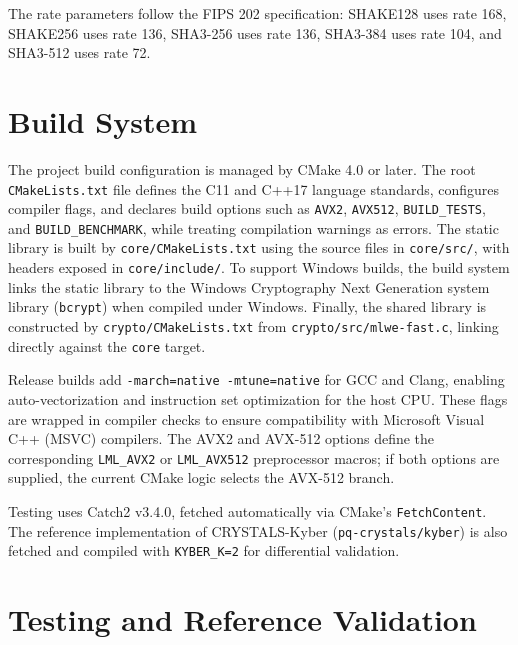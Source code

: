 The rate parameters follow the FIPS 202 specification: SHAKE128 uses rate 168, SHAKE256 uses rate 136, SHA3-256 uses rate 136, SHA3-384 uses rate 104, and SHA3-512 uses rate 72.

\section{Build System}
\label{sec:build_system}

The project build configuration is managed by CMake 4.0 or later. The root \texttt{CMake}\allowbreak\texttt{Lists.txt} file defines the C11 and C++17 language standards, configures compiler flags, and declares build options such as \texttt{AVX2}, \texttt{AVX512}, \texttt{BUILD\_}\allowbreak\texttt{TESTS}, and \texttt{BUILD\_}\allowbreak\texttt{BENCHMARK}, while treating compilation warnings as errors. The static library is built by \texttt{core/}\allowbreak\texttt{CMake}\allowbreak\texttt{Lists.txt} using the source files in \texttt{core/}\allowbreak\texttt{src/}, with headers exposed in \texttt{core/}\allowbreak\texttt{include/}. To support Windows builds, the build system links the static library to the Windows Cryptography Next Generation system library (\texttt{bcrypt}) when compiled under Windows. Finally, the shared library is constructed by \texttt{crypto/}\allowbreak\texttt{CMake}\allowbreak\texttt{Lists.txt} from \texttt{crypto/}\allowbreak\texttt{src/}\allowbreak\texttt{mlwe-}\allowbreak\texttt{fast.c}, linking directly against the \texttt{core} target.

Release builds add \texttt{-march=native -mtune=native} for GCC and Clang, enabling auto-vectorization and instruction set optimization for the host CPU. These flags are wrapped in compiler checks to ensure compatibility with Microsoft Visual C++ (MSVC) compilers. The AVX2 and AVX-512 options define the corresponding \texttt{LML\_AVX2} or \texttt{LML\_AVX512} preprocessor macros; if both options are supplied, the current CMake logic selects the AVX-512 branch.

Testing uses Catch2 v3.4.0, fetched automatically via CMake's \texttt{FetchContent}. The reference implementation of CRYSTALS-Kyber (\texttt{pq-crystals/kyber}) is also fetched and compiled with \texttt{KYBER\_K=2} for differential validation.

\section{Testing and Reference Validation}
\label{sec:testing_reference_validation}

